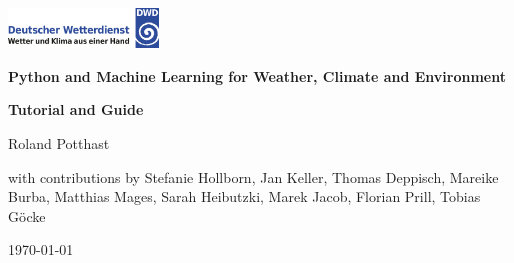 \documentclass[11pt,oneside]{book} %
\begin{document}
\frontmatter
\begin{titlepage}
	\begin{flushright}
    \includegraphics[width=0.3\textwidth]{images/DWD-Logo_2013.svg.png}
	\end{flushright}

  \centering
	\vspace{4cm}
  
  {\Huge\bfseries Python and Machine Learning for Weather, Climate and Environment \par}
  \vspace{1cm}
  
  {\Large\bfseries Tutorial and Guide\par}
  \vspace{2cm}
  
  {\Large Roland Potthast \par 
	
	with contributions by Stefanie Hollborn, Jan Keller, Thomas Deppisch, Mareike Burba, Matthias Mages, Sarah Heibutzki, Marek Jacob, Florian Prill, Tobias Göcke \par}
  \vfill
  {\Large \today\par}
\end{titlepage}

\tableofcontents

\frontmatter
\renewcommand{\thechapter}{\Roman{chapter}}
\renewcommand{\thesection}{\thechapter\Roman{section}} %


\renewcommand{\thechapter}{\arabic{chapter}}
\renewcommand{\thesection}{\arabic{chapter}.\arabic{section}}

\mainmatter

\end{document}
